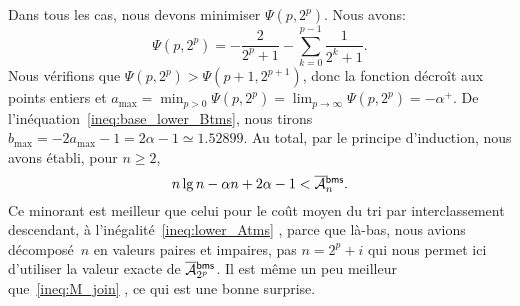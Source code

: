 Dans tous les cas, nous devons minimiser \(\Psi(p,2^p)\). Nous avons:
\begin{equation*}
\Psi(p,2^p) = - \frac{2}{2^p+1} - \sum_{k=0}^{p-1}\frac{1}{2^k+1}.
\end{equation*}
Nous vérifions que \(\Psi(p,2^p) > \Psi(p+1,2^{p+1})\), donc la
fonction décroît aux points entiers et \(a_{\max} = \min_{p >
  0}\Psi(p,2^p) = \lim_{p \to \infty}\Psi(p,2^p) = -\alpha^{+}\). De
l'inéquation~\eqref{ineq:base_lower_Btms}, nous tirons \(b_{\max} =
-2a_{\max} - 1 = 2\alpha - 1 \simeq 1.52899\). Au total, par le
principe d'induction, nous avons établi, pour \(n \geqslant 2\),
\begin{equation*}
n\lg n - \alpha n + 2\alpha -1 < \OM{\fun{bms}}{n}.
\end{equation*}
Ce minorant est meilleur que celui pour le coût moyen du tri par
interclassement descendant, à l'inégalité~\eqref{ineq:lower_Atms}
, parce que là-bas, nous avions
décomposé~\(n\) en valeurs paires et impaires, pas \(n=2^p+i\) qui
nous permet ici d'utiliser la valeur exacte de
\(\OM{\fun{bms}}{2^p}\). Il est même un peu meilleur
que~\eqref{ineq:M_join} , ce qui est une bonne
surprise.

